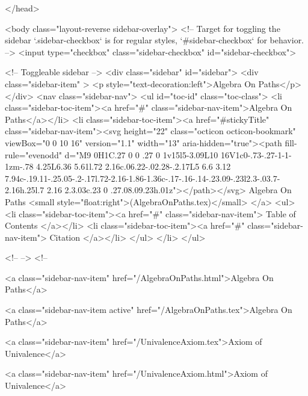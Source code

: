 </head>


  <body class="layout-reverse sidebar-overlay">
    <!-- Target for toggling the sidebar `.sidebar-checkbox` is for regular
     styles, `#sidebar-checkbox` for behavior. -->
<input type="checkbox" class="sidebar-checkbox" id="sidebar-checkbox">

<!-- Toggleable sidebar -->
<div class="sidebar" id="sidebar">
  <div class="sidebar-item" >
    <p style="text-decoration:left">Algebra On Paths</p>
  </div>
  <nav class="sidebar-nav">
    <ul id="toc-id" class="toc-class">
  <li class="sidebar-toc-item"><a href="#" class="sidebar-nav-item">Algebra On Paths</a></li>
  <li class="sidebar-toc-item"><a href="#stickyTitle" class="sidebar-nav-item"><svg height="22" class="octicon octicon-bookmark" viewBox="0 0 10 16" version="1.1" width="13" aria-hidden="true"><path fill-rule="evenodd" d="M9 0H1C.27 0 0 .27 0 1v15l5-3.09L10 16V1c0-.73-.27-1-1-1zm-.78 4.25L6.36 5.61l.72 2.16c.06.22-.02.28-.2.17L5 6.6 3.12 7.94c-.19.11-.25.05-.2-.17l.72-2.16-1.86-1.36c-.17-.16-.14-.23.09-.23l2.3-.03.7-2.16h.25l.7 2.16 2.3.03c.23 0 .27.08.09.23h.01z"></path></svg> Algebra On Paths <small style="float:right">(AlgebraOnPaths.tex)</small>
</a>
    <ul>
      <li class="sidebar-toc-item"><a href="#" class="sidebar-nav-item"> Table of Contents </a></li>
      <li class="sidebar-toc-item"><a href="#" class="sidebar-nav-item"> Citation </a></li>
    </ul>
  </li>
</ul>


    <!--  -->
    <!-- 
      
    
      
    
      
    
      
        
      
    
      
        
          <a class="sidebar-nav-item" href="/AlgebraOnPaths.html">Algebra On Paths</a>
        
      
    
      
        
          <a class="sidebar-nav-item active" href="/AlgebraOnPaths.tex">Algebra On Paths</a>
        
      
    
      
        
          <a class="sidebar-nav-item" href="/UnivalenceAxiom.tex">Axiom of Univalence</a>
        
      
    
      
        
          <a class="sidebar-nav-item" href="/UnivalenceAxiom.html">Axiom of Univalence</a>
        
